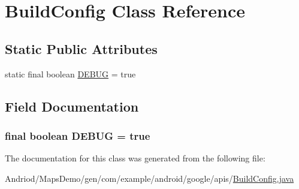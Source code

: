 \hypertarget{classcom_1_1example_1_1android_1_1google_1_1apis_1_1_build_config}{\section{Build\-Config Class Reference}
\label{classcom_1_1example_1_1android_1_1google_1_1apis_1_1_build_config}
}
\subsection*{Static Public Attributes}
\begin{DoxyCompactItemize}
\item 
static final boolean \hyperlink{classcom_1_1example_1_1android_1_1google_1_1apis_1_1_build_config_a8270736aa6257cdc33f11a875840a05e}{D\-E\-B\-U\-G} = true
\end{DoxyCompactItemize}


\subsection{Field Documentation}
\hypertarget{classcom_1_1example_1_1android_1_1google_1_1apis_1_1_build_config_a8270736aa6257cdc33f11a875840a05e}{
\subsubsection[{D\-E\-B\-U\-G}]{\setlength{\rightskip}{0pt plus 5cm}final boolean D\-E\-B\-U\-G = true\hspace{0.3cm}{\ttfamily [static]}}}\label{classcom_1_1example_1_1android_1_1google_1_1apis_1_1_build_config_a8270736aa6257cdc33f11a875840a05e}


The documentation for this class was generated from the following file\-:\begin{DoxyCompactItemize}
\item 
Andriod/\-Maps\-Demo/gen/com/example/android/google/apis/\hyperlink{_maps_demo_2gen_2com_2example_2android_2google_2apis_2_build_config_8java}{Build\-Config.\-java}\end{DoxyCompactItemize}

